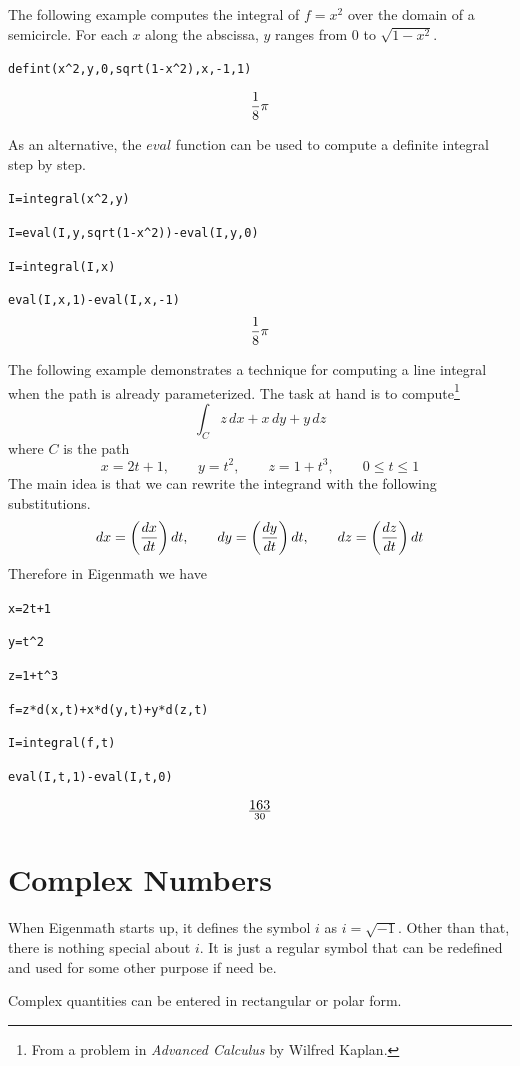\documentclass[12pt]{book}
\begin{document}
\medskip
\noindent
The following example computes the integral of $f=x^2$
over the domain of a semicircle.
For each $x$ along the abscissa, $y$ ranges from 0 to $\sqrt{1-x^2}$.

\medskip
\verb$defint(x^2,y,0,sqrt(1-x^2),x,-1,1)$

$${1\over8}\pi$$

\medskip
\noindent
As an alternative, the $eval$ function can be used to compute a definite integral step by step.

\medskip
\verb$I=integral(x^2,y)$

\verb$I=eval(I,y,sqrt(1-x^2))-eval(I,y,0)$

\verb$I=integral(I,x)$

\verb$eval(I,x,1)-eval(I,x,-1)$
$${1\over8}\pi$$

\newpage

\noindent
The following example demonstrates a technique for computing
a line integral when the path is already parameterized.
The task at hand is to compute\footnote{
From a problem in {\it Advanced Calculus} by Wilfred Kaplan.}
$$\int_C z\,dx+x\,dy+y\,dz$$
where $C$ is the path
$$x=2t+1,\qquad y=t^2,\qquad z=1+t^3,\qquad 0\le t\le 1$$
The main idea is that we can rewrite the integrand with the following substitutions.
$$dx=\left({dx\over dt}\right)dt,\qquad
dy=\left({dy\over dt}\right)dt,\qquad
dz=\left({dz\over dt}\right)dt$$
Therefore in Eigenmath we have

\medskip
\verb$x=2t+1$

\verb$y=t^2$

\verb$z=1+t^3$

\verb$f=z*d(x,t)+x*d(y,t)+y*d(z,t)$

\verb$I=integral(f,t)$

\verb$eval(I,t,1)-eval(I,t,0)$

$$163\over30$$

\newpage



\newpage

\chapter{Complex Numbers}

\noindent
When Eigenmath starts up, it defines the symbol $i$ as $i=\sqrt{-1}$.
Other than that, there is nothing special about $i$.
It is just a regular symbol that can be redefined and used for some other purpose if need be.

\medskip
\noindent
Complex quantities can be entered in rectangular or polar form.
\end{document}
